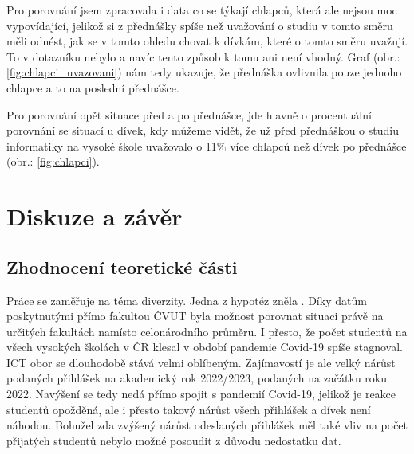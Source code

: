 \documentclass[12pt]{report}			%
\begin{document}
                Pro porovnání jsem zpracovala i data co se týkají chlapců, která ale nejsou moc vypovídající, jelikož si z přednášky spíše než uvažování o studiu v tomto směru měli odnést, jak se v tomto ohledu chovat k dívkám, které o tomto směru uvažují. To v dotazníku nebylo a navíc tento způsob k tomu ani není vhodný. Graf (obr.: \ref{fig:chlapci_uvazovani}) nám tedy ukazuje, že přednáška ovlivnila pouze jednoho chlapce a to na poslední přednášce.  
                
                Pro porovnání opět situace před a po přednášce, jde hlavně o procentuální porovnání se situací u dívek, kdy můžeme vidět, že už před přednáškou o studiu informatiky na vysoké škole uvažovalo o 11\% více chlapců než dívek po přednášce (obr.: \ref{fig:chlapci}).
                

	\chapter*{Diskuze a závěr}
	    \section{Zhodnocení teoretické části}
	    
	        Práce se zaměřuje na téma diverzity. Jedna z hypotéz zněla \textit{}. Díky datům poskytnutými přímo fakultou ČVUT byla možnost porovnat situaci právě na určitých fakultách namísto celonárodního průměru. I přesto, že počet studentů na všech vysokých školách v ČR klesal v období pandemie Covid-19 spíše stagnoval. ICT obor se dlouhodobě stává velmi oblíbeným. Zajímavostí je ale velký nárůst podaných přihlášek na akademický rok 2022/2023, podaných na začátku roku 2022. Navýšení se tedy nedá přímo spojit s pandemií Covid-19, jelikož je reakce studentů opožděná, ale i přesto takový nárůst všech přihlášek a dívek není náhodou. Bohužel zda zvýšený nárůst odeslaných přihlášek měl také vliv na počet přijatých studentů nebylo možné posoudit z důvodu nedostatku dat.
            
\end{document}

